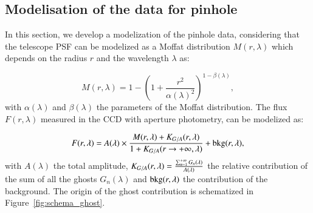 \subsection{Modelisation of the \SD data for \spinhole pinhole}


In this section, we develop a modelization of the \spinhole pinhole data, considering that the \SD telescope PSF can be modelized as a Moffat distribution \citep{moffat} $M(r, \lambda)$ which depends on the radius $r$ and the wavelength $\lambda$ as:

\begin{equation}
M(r, \lambda)= 1 - \left( 1+\frac{r^2}{\alpha(\lambda)^2} \right)^{1-\beta(\lambda)},
\end{equation}
with $\alpha(\lambda)$ and $\beta(\lambda)$ the parameters of the Moffat distribution. The flux $F(r, \lambda)$ measured in the CCD with aperture photometry, can be modelized as: 


\begin{equation}
F(r, \lambda) = A(\lambda) \times \frac{M(r, \lambda) + K_{G/A}(r, \lambda)}{1 + K_{G/A}(r \rightarrow +\infty, \lambda)} + \mathrm{bkg}(r, \lambda),
\label{eq:moffat_model}
\end{equation}
with $A(\lambda)$ the total amplitude, $K_{G/A}(r, \lambda) = \frac{\sum_{n=1}^{+\infty} G_n(\lambda)}{A(\lambda)}$ the relative contribution of the sum of all the ghosts $G_n(\lambda)$ and $\mathrm{bkg}(r, \lambda)$ the contribution of the background. The origin of the ghost contribution is schematized in Figure~\ref{fig:schema_ghost}.

